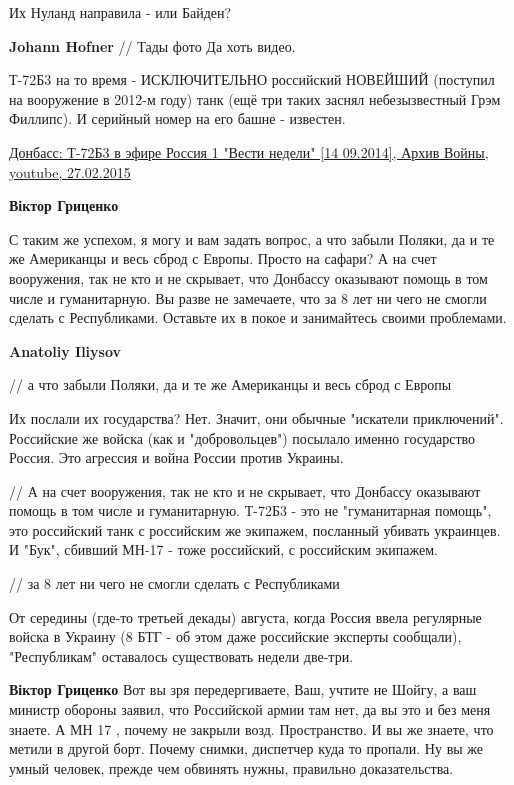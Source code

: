 \begin{itemize}
\begin{itemize}
Их Нуланд направила - или Байден?

\textbf{Johann Hofner} // Тады фото
Да хоть видео.

Т-72Б3 на то время - ИСКЛЮЧИТЕЛЬНО российский НОВЕЙШИЙ (поступил на вооружение
в 2012-м году) танк (ещё три таких заснял небезызвестный Грэм Филлипс). И
серийный номер на его башне - известен.

\href{https://www.youtube.com/watch?v=gUvrQx86VH4}{%
Донбасс: Т-72Б3 в эфире Россия 1 "Вести недели" [14 09.2014], Архив Войны, youtube, 27.02.2015%
}

\textbf{Віктор Гриценко} 

С таким же успехом, я могу и вам задать вопрос, а что забыли Поляки, да и те же
Американцы и весь сброд с Европы. Просто на сафари? А на счет вооружения, так
не кто и не скрывает, что Донбассу оказывают помощь в том числе и гуманитарную.
Вы разве не замечаете, что за 8 лет ни чего не смогли сделать с Республиками.
Оставьте их в покое и занимайтесь своими проблемами.


\textbf{Anatoliy Iliysov} 

// а что забыли Поляки, да и те же Американцы и весь сброд с Европы

Их послали их государства? Нет. Значит, они обычные "искатели приключений".
Российские же войска (как и "добровольцев") посылало именно государство Россия. Это агрессия и война России против Украины.

// А на счет вооружения, так не кто и не скрывает, что Донбассу оказывают помощь в том числе и гуманитарную.
Т-72Б3 - это не "гуманитарная помощь", это российский танк с российским же экипажем, посланный убивать украинцев.
И "Бук", сбивший МН-17 - тоже российский, с российским экипажем.

// за 8 лет ни чего не смогли сделать с Республиками

От середины (где-то третьей декады) августа, когда Россия ввела регулярные войска в Украину (8 БТГ - об этом даже российские эксперты сообщали), "Республикам" оставалось существовать недели две-три.

\textbf{Віктор Гриценко} Вот вы зря передергиваете, Ваш, учтите не Шойгу, а ваш министр обороны заявил, что Российской армии там нет, да вы это и без меня знаете. А МН 17 , почему не закрыли возд. Пространство. И вы же знаете, что метили в другой борт. Почему снимки, диспетчер куда то пропали. Ну вы же умный человек, прежде чем обвинять нужны, правильно доказательства.


\end{itemize}
\end{itemize}
